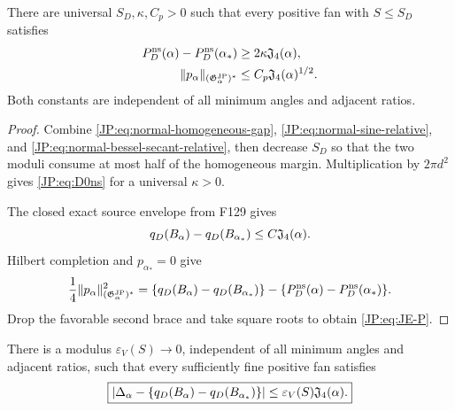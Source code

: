 \begin{theorem}
\label{JP:thm:normal-disk-endpoint}
There are universal $S_D,\kappa,C_p>0$ such that every positive fan with
$S\le S_D$ satisfies
\begin{align}
 P_D^{\rm ns}(\alpha)-P_D^{\rm ns}(\alpha_*)
 &\ge2\kappa\mathfrak J_4(\alpha),
 \label{JP:eq:D0ns}\\
 \|p_\alpha\|_{(\mathfrak G^{\rm JP}_\alpha)^*}
 &\le C_p\mathfrak J_4(\alpha)^{1/2}.
 \label{JP:eq:JE-P}
\end{align}
Both constants are independent of all minimum angles and adjacent ratios.
\end{theorem}

\begin{proof}
Combine \eqref{JP:eq:normal-homogeneous-gap},
\eqref{JP:eq:normal-sine-relative}, and
\eqref{JP:eq:normal-bessel-secant-relative}, then decrease $S_D$ so that the
two moduli consume at most half of the homogeneous margin.  Multiplication
by $2\pi d^2$ gives \eqref{JP:eq:D0ns} for a universal $\kappa>0$.

The closed exact source envelope from F129 gives
\[
 q_D(B_\alpha)-q_D(B_{\alpha_*})\le C\mathfrak J_4(\alpha).
\]
Hilbert completion and $p_{\alpha_*}=0$ give
\[
 \frac14\|p_\alpha\|_{(\mathfrak G^{\rm JP}_\alpha)^*}^2
 =\{q_D(B_\alpha)-q_D(B_{\alpha_*})\}
  -\{P_D^{\rm ns}(\alpha)-P_D^{\rm ns}(\alpha_*)\}.
\]
Drop the favorable second brace and take square roots to obtain
\eqref{JP:eq:JE-P}.
\end{proof}

\begin{theorem}
\label{JP:thm:normal-value-matching}
There is a modulus $\varepsilon_V(S)\to0$, independent of all minimum
angles and adjacent ratios, such that every sufficiently fine positive fan
satisfies
\begin{equation}\label{JP:eq:JE-V}
 \boxed{
 \left|\Delta_\alpha-
 \{q_D(B_\alpha)-q_D(B_{\alpha_*})\}\right|
 \le\varepsilon_V(S)\mathfrak J_4(\alpha).}
\end{equation}
\end{theorem}

